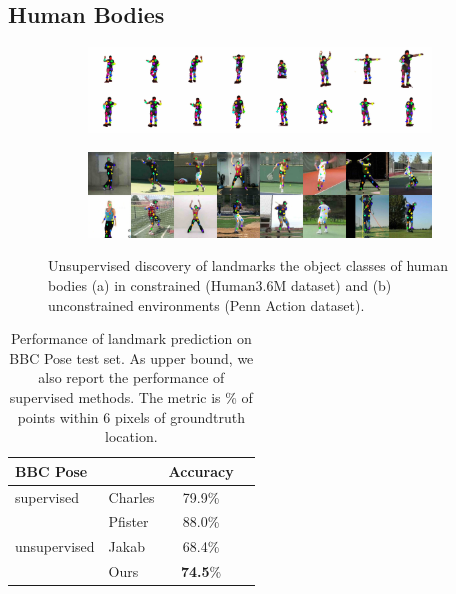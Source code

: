 	\subsection{Human Bodies}
		\begin{figure}[htp]
			\centering
			\begin{subfigure}{1.\textwidth}
			\includegraphics[trim={0cm 0cm 0cm 0cm},clip, width=1.\linewidth]{fig/shape/0human}\caption{}
			\end{subfigure}
			\begin{subfigure}{1.\textwidth}
			\includegraphics[trim={0cm 0cm 0cm 0cm},clip, width=1.\linewidth]{fig/shape/0penn}\caption{}
			\end{subfigure}
			\caption{{Unsupervised discovery of landmarks the object classes of human bodies (a) in constrained (Human3.6M dataset) and (b) unconstrained environments (Penn Action dataset).}}
			\label{fig:kp_bodies}
		\end{figure}


		\begin{table}[t]
			\caption{{
			Performance of landmark prediction on BBC Pose test set. As upper bound, we also report the performance of supervised methods.
			The metric is \% of points within 6 pixels of groundtruth location. %
			}}
			\label{tab:bbcpose}
			\centering
			\begin{tabular}{ll|cr}
			\hline
			BBC Pose &   &    { Accuracy}  \\
			 \hline
			supervised & Charles \cite{charles13bbcpose} &
			   79.9\%  \\ %
			 & Pfister \cite{pfister15flowingconv}  &
			  88.0\%  \\ \hline %
			unsupervised &Jakab \cite{jakab18} &
			 68.4\%  \\  %
			  &Ours &  \textbf{74.5}\% \\
			\hline
			\end{tabular}
		\end{table}

